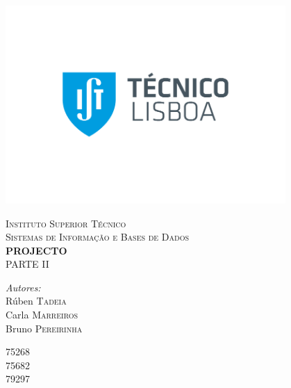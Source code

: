 \documentclass[12pt,a4paper,oneside]{article}
\begin{document}
\begin{titlepage}
\begin{center}

\vspace*{-2cm}\includegraphics[width=0.8\textwidth]{./imagens/IST_A_RGB_POS}

\textsc{\Large Instituto Superior Técnico}\\[1cm]

\textsc{\large Sistemas de Informação e Bases de Dados}\\[1cm]

{ \huge \bfseries PROJECTO}
\\[2cm]
\textsc{\large PARTE II}\\[1cm]

\noindent
\begin{minipage}{0.4\textwidth}
\begin{flushleft} \large
\emph{Autores:}\\
Rúben\textsc{ Tadeia}\\
Carla\textsc{ Marreiros}\\
Bruno\textsc{ Pereirinha}\\
\end{flushleft}
\end{minipage}%
\begin{minipage}{0.4\textwidth}
\begin{flushright} \large
75268\\
75682\\
79297\\
\end{flushright}
\end{minipage}
\\[1.5cm]


\end{center}
\end{titlepage}
\end{document}
